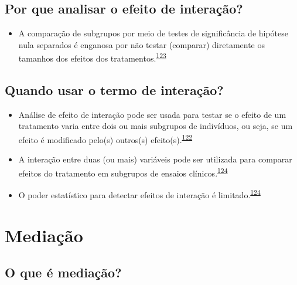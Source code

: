 \documentclass[
]{book}
\providecommand{\tightlist}{%
  \setlength{\itemsep}{0pt}\setlength{\parskip}{0pt}}
\begin{document}
\hypertarget{por-que-analisar-o-efeito-de-interauxe7uxe3o}{%
\subsection{Por que analisar o efeito de interação?}\label{por-que-analisar-o-efeito-de-interauxe7uxe3o}}

\begin{itemize}
\tightlist
\item
  A comparação de subgrupos por meio de testes de significância de hipótese nula separados é enganosa por não testar (comparar) diretamente os tamanhos dos efeitos dos tratamentos.\textsuperscript{\protect\hyperlink{ref-Matthews1996}{123}}
\end{itemize}

\hypertarget{quando-usar-o-termo-de-interauxe7uxe3o}{%
\subsection{Quando usar o termo de interação?}\label{quando-usar-o-termo-de-interauxe7uxe3o}}

\begin{itemize}
\item
  Análise de efeito de interação pode ser usada para testar se o efeito de um tratamento varia entre dois ou mais subgrupos de indivíduos, ou seja, se um efeito é modificado pelo(s) outros(s) efeito(s).\textsuperscript{\protect\hyperlink{ref-Altman1996}{122}}
\item
  A interação entre duas (ou mais) variáveis pode ser utilizada para comparar efeitos do tratamento em subgrupos de ensaios clínicos.\textsuperscript{\protect\hyperlink{ref-Altman2003}{124}}
\item
  O poder estatístico para detectar efeitos de interação é limitado.\textsuperscript{\protect\hyperlink{ref-Altman2003}{124}}
\end{itemize}

\hypertarget{mediacao}{%
\section{Mediação}\label{mediacao}}

\hypertarget{o-que-uxe9-mediauxe7uxe3o}{%
\subsection{O que é mediação?}\label{o-que-uxe9-mediauxe7uxe3o}}
\end{document}
